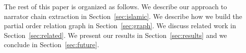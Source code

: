\documentclass{llncs}
\begin{document}
The rest of this paper is organized as follows. 
We describe our approach to narrator chain extraction
in Section~\ref{sec:islamic}.
We describe how we build the partial order relation
graph in Section~\ref{sec:graph}.
We discuss related work in Section~\ref{sec:related}.
We present our results in Section~\ref{sec:results} and 
we conclude in Section~\ref{sec:future}.




\end{document}
